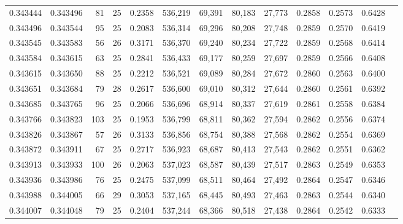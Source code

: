 \begin{tabular}{rrrrrrrrrrrrr}
0.343444 & 0.343496 &    81 &  25 &                                     0.2358 & 536,219 &  69,391 &  80,183 &  27,773 & 0.2858 & 0.2573 & 0.6428 \\
0.343496 & 0.343544 &    95 &  25 &                                     0.2083 & 536,314 &  69,296 &  80,208 &  27,748 & 0.2859 & 0.2570 & 0.6419 \\
0.343545 & 0.343583 &    56 &  26 &                                     0.3171 & 536,370 &  69,240 &  80,234 &  27,722 & 0.2859 & 0.2568 & 0.6414 \\
0.343584 & 0.343615 &    63 &  25 &                                     0.2841 & 536,433 &  69,177 &  80,259 &  27,697 & 0.2859 & 0.2566 & 0.6408 \\
0.343615 & 0.343650 &    88 &  25 &                                     0.2212 & 536,521 &  69,089 &  80,284 &  27,672 & 0.2860 & 0.2563 & 0.6400 \\
0.343651 & 0.343684 &    79 &  28 &                                     0.2617 & 536,600 &  69,010 &  80,312 &  27,644 & 0.2860 & 0.2561 & 0.6392 \\
0.343685 & 0.343765 &    96 &  25 &                                     0.2066 & 536,696 &  68,914 &  80,337 &  27,619 & 0.2861 & 0.2558 & 0.6384 \\
0.343766 & 0.343823 &   103 &  25 &                                     0.1953 & 536,799 &  68,811 &  80,362 &  27,594 & 0.2862 & 0.2556 & 0.6374 \\
0.343826 & 0.343867 &    57 &  26 &                                     0.3133 & 536,856 &  68,754 &  80,388 &  27,568 & 0.2862 & 0.2554 & 0.6369 \\
0.343872 & 0.343911 &    67 &  25 &                                     0.2717 & 536,923 &  68,687 &  80,413 &  27,543 & 0.2862 & 0.2551 & 0.6362 \\
0.343913 & 0.343933 &   100 &  26 &                                     0.2063 & 537,023 &  68,587 &  80,439 &  27,517 & 0.2863 & 0.2549 & 0.6353 \\
0.343936 & 0.343986 &    76 &  25 &                                     0.2475 & 537,099 &  68,511 &  80,464 &  27,492 & 0.2864 & 0.2547 & 0.6346 \\
0.343988 & 0.344005 &    66 &  29 &                                     0.3053 & 537,165 &  68,445 &  80,493 &  27,463 & 0.2863 & 0.2544 & 0.6340 \\
0.344007 & 0.344048 &    79 &  25 &                                     0.2404 & 537,244 &  68,366 &  80,518 &  27,438 & 0.2864 & 0.2542 & 0.6333 \\

\end{tabular}
